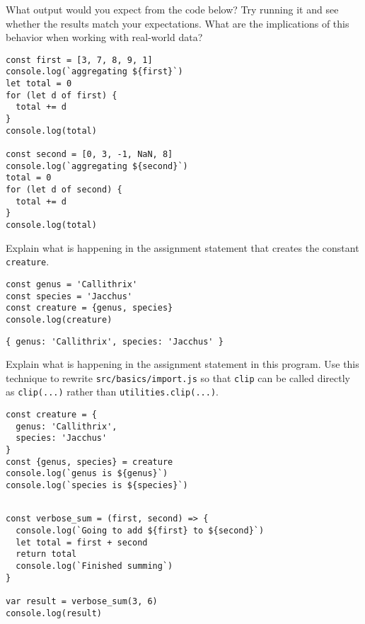 
What output would you expect from the code below?
Try running it and see whether the results match your expectations.
What are the implications of this behavior when working with real-world data?

\begin{verbatim}
const first = [3, 7, 8, 9, 1]
console.log(`aggregating ${first}`)
let total = 0
for (let d of first) {
  total += d
}
console.log(total)

const second = [0, 3, -1, NaN, 8]
console.log(`aggregating ${second}`)
total = 0
for (let d of second) {
  total += d
}
console.log(total)
\end{verbatim}


Explain what is happening in the assignment statement that creates the constant \texttt{creature}.

\begin{verbatim}
const genus = 'Callithrix'
const species = 'Jacchus'
const creature = {genus, species}
console.log(creature)
\end{verbatim}

\begin{verbatim}
{ genus: 'Callithrix', species: 'Jacchus' }
\end{verbatim}


Explain what is happening in the assignment statement in this program.
Use this technique to rewrite \texttt{src/basics/import.js}
so that \texttt{clip} can be called directly as \texttt{clip(...)} rather than \texttt{utilities.clip(...)}.

\begin{verbatim}
const creature = {
  genus: 'Callithrix',
  species: 'Jacchus'
}
const {genus, species} = creature
console.log(`genus is ${genus}`)
console.log(`species is ${species}`)
\end{verbatim}

\begin{verbatim}
  
const verbose_sum = (first, second) => {
  console.log(`Going to add ${first} to ${second}`)
  let total = first + second
  return total
  console.log(`Finished summing`)
}

var result = verbose_sum(3, 6)
console.log(result)
\end{verbatim}

